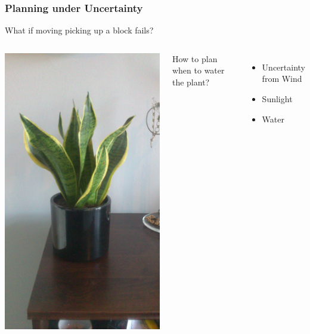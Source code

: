 \documentclass{beamer}
\let\origframetitle=\frametitle
\renewcommand\frametitle[1]{\origframetitle{\textbf{\large{\textrm{#1}}}}}
\begin{document}
\begin{frame}
  \frametitle{Planning under Uncertainty}

  What if moving picking up a block fails?
  \vspace{2cm}

  \begin{columns}
    \includegraphics[width=\textwidth,angle=270]{images/plant.jpg}


    How to plan when to water the plant?

    \begin{itemize}
      \item Uncertainty from Wind
      \item Sunlight
      \item Water
    \end{itemize}

  \end{columns}


\end{frame}
\end{document}
